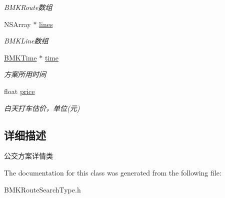 \begin{DoxyCompactItemize}
\begin{DoxyCompactList}\small\item\em B\-M\-K\-Route数组 \end{DoxyCompactList}\item 
\hypertarget{interface_b_m_k_transit_route_plan_a76eb4afd803434e6252318822c5df75e}{N\-S\-Array $\ast$ \hyperlink{interface_b_m_k_transit_route_plan_a76eb4afd803434e6252318822c5df75e}{lines}}\label{interface_b_m_k_transit_route_plan_a76eb4afd803434e6252318822c5df75e}

\begin{DoxyCompactList}\small\item\em B\-M\-K\-Line数组 \end{DoxyCompactList}\item 
\hypertarget{interface_b_m_k_transit_route_plan_a191483e821f28383b0ef3aacd00e09d1}{\hyperlink{interface_b_m_k_time}{B\-M\-K\-Time} $\ast$ \hyperlink{interface_b_m_k_transit_route_plan_a191483e821f28383b0ef3aacd00e09d1}{time}}\label{interface_b_m_k_transit_route_plan_a191483e821f28383b0ef3aacd00e09d1}

\begin{DoxyCompactList}\small\item\em 方案所用时间 \end{DoxyCompactList}\item 
\hypertarget{interface_b_m_k_transit_route_plan_a6b7fb35106fc9365da12bddd3b99d682}{float \hyperlink{interface_b_m_k_transit_route_plan_a6b7fb35106fc9365da12bddd3b99d682}{price}}\label{interface_b_m_k_transit_route_plan_a6b7fb35106fc9365da12bddd3b99d682}

\begin{DoxyCompactList}\small\item\em 白天打车估价，单位(元) \end{DoxyCompactList}\end{DoxyCompactItemize}


\subsection{详细描述}
公交方案详情类 

The documentation for this class was generated from the following file\-:\begin{DoxyCompactItemize}
\item 
B\-M\-K\-Route\-Search\-Type.\-h\end{DoxyCompactItemize}
